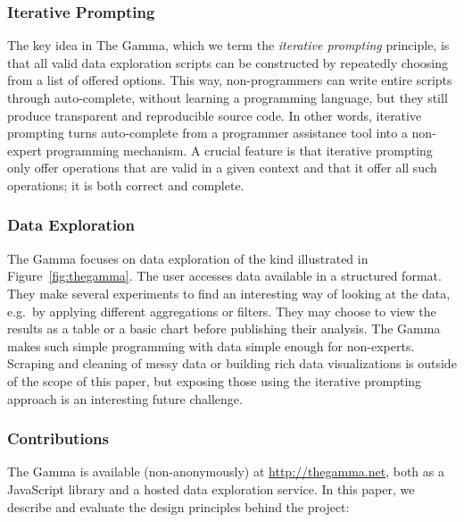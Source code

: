 \documentclass[manuscript,review,anonymous]{acmart}
\begin{document}
\subsubsection*{Iterative Prompting}
The key idea in The Gamma, which we term the \emph{iterative prompting} principle, is that all
valid data exploration scripts can be constructed by repeatedly choosing from a list
of offered options. This way, non-programmers can write entire scripts through auto-complete,
without learning a programming language, but they still produce transparent and reproducible
source code. In other words, iterative prompting turns auto-complete from a programmer assistance
tool into a non-expert programming mechanism. A crucial feature is that iterative prompting
only offer operations that are valid in a given context and that it offer all such operations;
it is both correct and complete.

\subsubsection*{Data Exploration}
The Gamma focuses on data exploration of the kind illustrated in Figure~\ref{fig:thegamma}.
The user accesses data available in a structured format. They make several experiments to find an
interesting way of looking at the data, e.g.~by applying different aggregations or filters. They
may choose to view the results as a table or a basic chart before publishing their analysis. The
Gamma makes such simple programming with data simple enough for non-experts. Scraping and cleaning
of messy data or building rich data visualizations is outside of the scope of this paper, but
exposing those using the iterative prompting approach is an interesting future challenge.

\subsubsection*{Contributions}
The Gamma is available (non-anonymously) at \url{http://thegamma.net},
both as a JavaScript library and a hosted data exploration service. In this paper, we describe and
evaluate the design principles behind the project:
\end{document}
